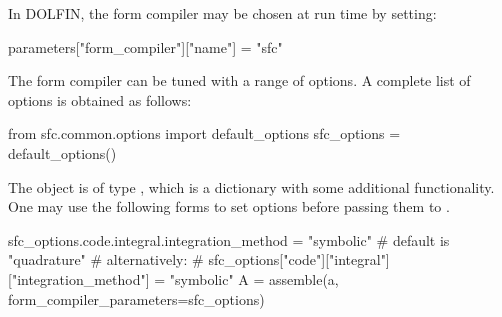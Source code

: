 In DOLFIN, the form compiler may be chosen at run time by setting:
\begin{python}
parameters["form_compiler"]["name"] = "sfc"
\end{python}
The form compiler can be tuned with a range of options. A complete list
of options is obtained as follows:
\begin{python}
from sfc.common.options import default_options
sfc_options = default_options()
\end{python}
The object  is of type , which is a
dictionary with some additional functionality. One may use the following
forms to set options before passing them to .
\begin{python}
sfc_options.code.integral.integration_method = "symbolic" # default is "quadrature"
# alternatively:
# sfc_options["code"]["integral"]["integration_method"] = "symbolic"
A = assemble(a, form_compiler_parameters=sfc_options)
\end{python}

